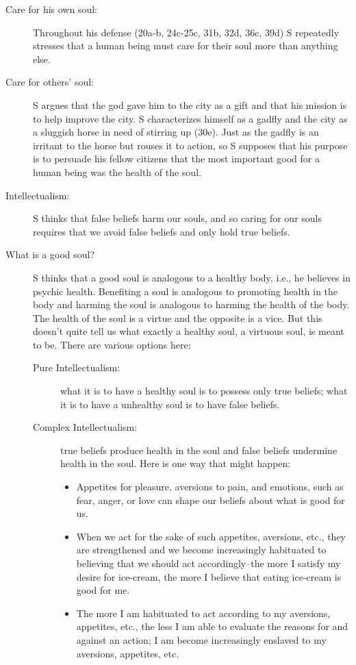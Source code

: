 \documentclass[oneside]{article}
\begin{document}
\begin{description}
\item[Care for his own soul:] Throughout his defense (20a-b, 24c-25c, 31b, 32d, 36c, 39d) S repeatedly stresses that a human being must care for their soul more than anything else. 
\item[Care for others' soul:] S argues that the god gave him to the city as a gift and that his mission is to help improve the city.  S characterizes himself as a gadfly and the city as a sluggish horse in need of stirring up (30e).  Just as the gadfly is an irritant to the horse but rouses it to action, so S supposes that his purpose is to persuade his fellow citizens that the most important good for a human being was the health of the soul.
\item[Intellectualism:] S thinks that false beliefs harm our souls, and so caring for our souls requires that we avoid false beliefs and only hold true beliefs. 
\item[What is a good soul?] S thinks that a good soul is analogous to a healthy body, i.e., he believes in psychic health. Benefiting a soul is analogous to promoting health in the body and harming the soul is analogous to harming the health of the body. The health of the soul is a virtue and the opposite is a vice. But this doesn't quite tell us what exactly a healthy soul, a virtuous soul, is meant to be. There are various options here: 
\begin{description}
\item[Pure Intellectualism:] what it is to have a healthy soul is to possess only true beliefs; what it is to have a unhealthy soul is to have false beliefs. 
\item[Complex Intellectualism:] true beliefs produce health in the soul and false beliefs undermine health in the soul. Here is one way that might happen:
\begin{itemize}
\item Appetites  for pleasure, aversions to pain, and emotions, such as fear, anger, or love can shape our beliefs about what is good for us. 
\item When we act for the sake of such appetites, aversions, etc., they are strengthened and we become increasingly habituated to believing that we should act accordingly--the  more I satisfy my desire for ice-cream, the more I believe that eating ice-cream is good for me.
\item The more I am habituated to act according to my aversions, appetites, etc., the less I am able to evaluate the reasons for and against an action; I am become increasingly enslaved to my aversions, appetites, etc. 
\end{itemize}
\end{description}
\end{description} 
\end{document}

